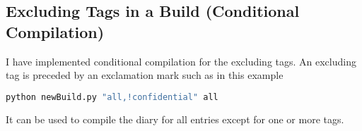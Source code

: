 \subsection{Excluding Tags in a Build (Conditional Compilation)}
\label{task:20140816_jkn0}
I have implemented conditional compilation for the excluding tags. An excluding tag is preceded by an exclamation mark such as in this example
\begin{lstlisting}[language=bash]
python newBuild.py "all,!confidential" all
\end{lstlisting}
It can be used to compile the diary for all entries except for one or more tags.
